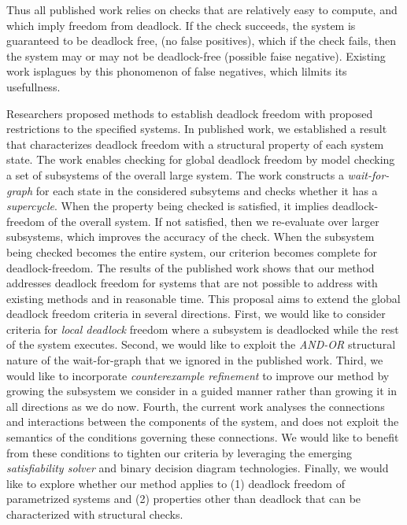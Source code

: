 Thus all published work relies on checks that are 
relatively easy to compute, and which imply freedom from deadlock. If the check succeeds, the system is guaranteed to be deadlock free, (no false
positives), which if the check fails, then the system may or may not be deadlock-free (possible faise negative).  Existing work isplagues by this
phonomenon of false negatives, which lilmits its usefullness.












Researchers proposed methods to establish deadlock freedom
with proposed restrictions to the specified systems. 
%
In published work, 
we established a result that characterizes deadlock freedom
with a structural property of each system state. 
The work enables checking for global deadlock freedom
by model checking a set of subsystems 
of the overall large system. 
The work constructs a {\em wait-for-graph} for each state
in the considered subsytems
and checks whether it has a {\em supercycle}. 
%
When the property being checked is satisfied, 
it implies deadlock-freedom of the overall system. 
If not satisfied, then we re-evaluate over larger subsystems,
which improves the accuracy of the check.  
When the subsystem being checked becomes the entire system, 
our criterion becomes complete for
deadlock-freedom.  
%
The results of the published work shows that our method
addresses deadlock freedom for systems that are not possible 
to address with existing methods and in reasonable time. 
%
This proposal aims to extend the global deadlock freedom 
criteria in several directions. 
First, we would like to consider criteria for {\em local deadlock}
freedom where
a subsystem is deadlocked while the rest of the system executes. 
%
Second, 
we would like to exploit the {\em AND-OR} structural nature of the 
wait-for-graph that we ignored in the published work. 
%
Third, 
we would like to incorporate {\em counterexample refinement}
to improve our method by growing the subsystem we consider in a
guided manner rather than growing it in all directions as we do now. 
%
Fourth, 
the current work analyses the connections and interactions
between the components of the system, and does not exploit the 
semantics of the conditions governing these connections. 
We would like to benefit from these conditions to tighten 
our criteria by leveraging the emerging {\em satisfiability 
solver} and binary decision diagram technologies.
%
%
Finally, 
we would like to explore whether our method applies to 
(1) deadlock freedom of parametrized systems and 
(2) properties other than deadlock that can be characterized 
with structural checks. 


